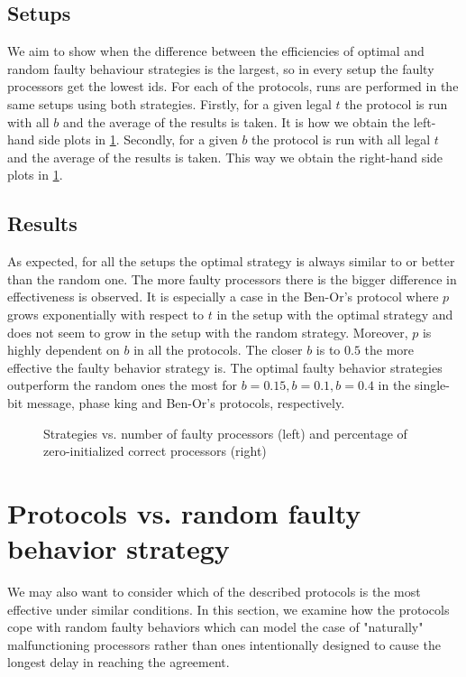 \subsection{Setups}
We aim to show when the difference between the efficiencies of optimal and random faulty behaviour strategies is the largest, so in every setup the faulty processors get the lowest ids.
For each of the protocols, runs are performed in the same setups using both strategies. Firstly, for a given legal $t$ the protocol is run with all $b$ and the average of the results is taken. It is how we obtain the left-hand side plots in \cref{fig:plot1}. Secondly, for a given $b$ the protocol is run with all legal $t$ and the average of the results is taken. This way we obtain the right-hand side plots in \cref{fig:plot1}.

\subsection{Results}
As expected, for all the setups the optimal strategy is always similar to or better than the random one. The more faulty processors there is the bigger difference in effectiveness is observed. It is especially a case in the Ben-Or's protocol where $p$ grows exponentially with respect to $t$ in the setup with the optimal strategy and does not seem to grow in the setup with the random strategy. Moreover, $p$ is highly dependent on $b$ in all the protocols. The closer $b$ is to $0.5$ the more effective the faulty behavior strategy is. The optimal faulty behavior strategies outperform the random ones the most for $b=0.15, b=0.1, b=0.4$ in the single-bit message, phase king and Ben-Or's protocols, respectively. 

\begin{figure}[H]
    \caption{Strategies vs. number of faulty processors (left) and percentage of zero-initialized correct processors (right) }
    \begin{center}
        
    \end{center}\label{fig:plot1}
\end{figure}


\section{Protocols vs. random faulty behavior strategy}
We may also want to consider which of the described protocols is the most effective under similar conditions. In this section, we examine how the protocols cope with random faulty behaviors which can model the case of "naturally" malfunctioning processors rather than ones intentionally designed to cause the longest delay in reaching the agreement.

